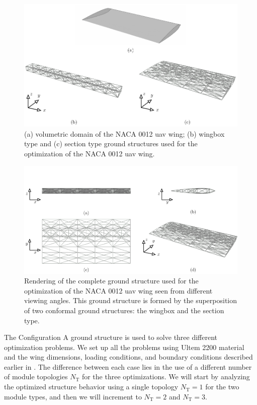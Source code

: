 \begin{figure}
    \centering
    \includegraphics[width=\linewidth]{figures/07_aeronautic/00_NACA_a_gs_cell/gs_a_types.pdf}
     \caption{(a) volumetric domain of the NACA 0012 \gls{uav} wing; (b) wingbox type and (c) section type ground structures used for the optimization of the NACA 0012 \gls{uav} wing.}
    \label{fig:07_gs_a_types}
\end{figure}

\begin{figure}
    \centering
    \includegraphics[width=\linewidth]{figures/07_aeronautic/00_NACA_gs/gs_a.pdf}
     \caption{Rendering of the complete ground structure used for the optimization of the NACA 0012 \gls{uav} wing seen from different viewing angles. This ground structure is formed by the superposition of two conformal ground structures: the wingbox and the section type.}
    \label{fig:07_gs_a}
\end{figure}

The Configuration A ground structure is used to solve three different optimization problems. We set up all the problems using Ultem 2200 material and the wing dimensions, loading conditions, and boundary conditions described earlier in . The difference between each case lies in the use of a different number of module topologies $N_\text{T}$ for the three optimizations. We will start by analyzing the optimized structure behavior using a single topology $N_\text{T}=1$ for the two module types, and then we will increment to $N_\text{T}=2$ and $N_\text{T}=3$.

